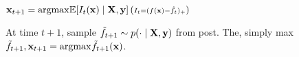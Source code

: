 \begin{definition}[EI]
    \(\vb{x}_{t+1} = \text{argmax}_{} \mathbb{E}[I_t(\vb{x}) \mid \vb{X}, \vb{y}] \, ({\scriptstyle I_t = (f(\vb{x}) - \hat f_t)_+})\)
\end{definition}

\begin{definition}
    At time \(t+1\), sample \(\tilde f_{t+1} \sim p(\cdot \mid \vb{X}, \vb{y})\) from post. The, simply max \(\tilde f_{t+1}, \vb{x}_{t+1} = \text{argmax}_{} \tilde f_{t+1}(\vb{x})\).
\end{definition}

